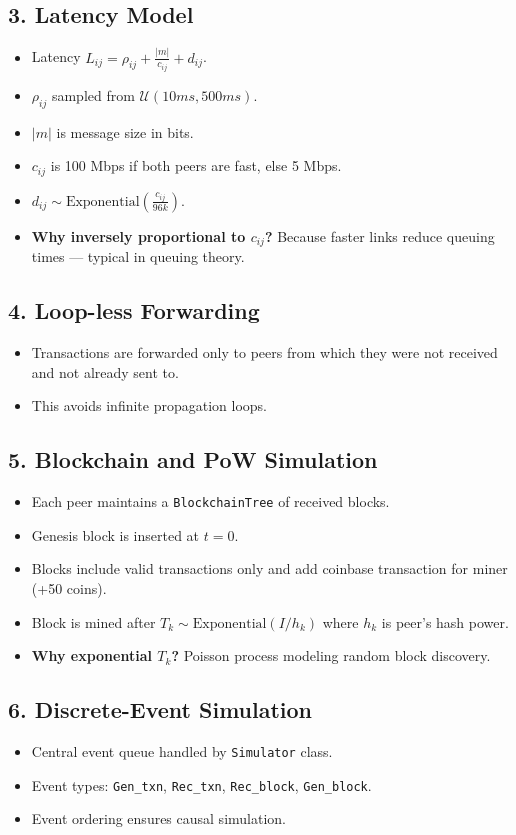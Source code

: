 \documentclass[11pt]{article}
\begin{document}
\subsection*{3. Latency Model}
\begin{itemize}
  \item Latency $L_{ij} = \rho_{ij} + \frac{|m|}{c_{ij}} + d_{ij}$.
  \item $\rho_{ij}$ sampled from $\mathcal{U}(10ms, 500ms)$.
  \item $|m|$ is message size in bits.
  \item $c_{ij}$ is 100 Mbps if both peers are fast, else 5 Mbps.
  \item $d_{ij} \sim \text{Exponential}(\frac{c_{ij}}{96k})$.
  \item \textbf{Why inversely proportional to $c_{ij}$?} Because faster links reduce queuing times — typical in queuing theory.
\end{itemize}

\subsection*{4. Loop-less Forwarding}
\begin{itemize}
  \item Transactions are forwarded only to peers from which they were not received and not already sent to.
  \item This avoids infinite propagation loops.
\end{itemize}

\subsection*{5. Blockchain and PoW Simulation}
\begin{itemize}
  \item Each peer maintains a \texttt{BlockchainTree} of received blocks.
  \item Genesis block is inserted at $t=0$.
  \item Blocks include valid transactions only and add coinbase transaction for miner (+50 coins).
  \item Block is mined after $T_k \sim \text{Exponential}(I/h_k)$ where $h_k$ is peer's hash power.
  \item \textbf{Why exponential $T_k$?} Poisson process modeling random block discovery.
\end{itemize}

\subsection*{6. Discrete-Event Simulation}
\begin{itemize}
  \item Central event queue handled by \texttt{Simulator} class.
  \item Event types: \texttt{Gen\_txn}, \texttt{Rec\_txn}, \texttt{Rec\_block}, \texttt{Gen\_block}.
  \item Event ordering ensures causal simulation.
\end{itemize}
\end{document}
